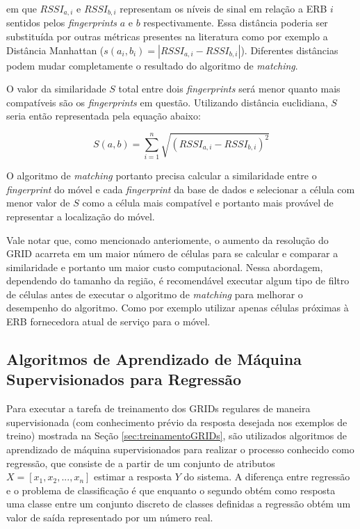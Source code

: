 \documentclass[12pt]{article}
\begin{document}
                \noindent em que $RSSI_{a,i}$ e $RSSI_{b,i}$ representam os níveis de sinal em relação a ERB $i$ sentidos pelos \textit{fingerprints} $a$ e $b$ respectivamente. Essa distância poderia ser substituída por outras métricas presentes na literatura como por exemplo a Distância Manhattan ($s(a_{i}, b_{i}) = |RSSI_{a,i} - RSSI_{b,i}|$). Diferentes distâncias podem mudar completamente o resultado do algoritmo de \textit{matching}. 
                
                O valor da similaridade $S$ total entre dois \textit{fingerprints} será menor quanto mais compatíveis são os \textit{fingerprints} em questão. Utilizando distância euclidiana, $S$ seria então representada pela equação abaixo:
                
                \begin{equation} 
                \label{eq:similaridadeEuclidiana}
                S(a,b) = \sum_{i=1}^{n} \sqrt{(RSSI_{a,i} - RSSI_{b,i})^2} 
                \end{equation}
                
                O algoritmo de \textit{matching} portanto precisa calcular a similaridade entre o \textit{fingerprint} do móvel e cada \textit{fingerprint} da base de dados e selecionar a célula com menor valor de $S$ como a célula mais compatível e portanto mais provável de representar a localização do móvel.
                
                Vale notar que, como mencionado anteriomente, o aumento da resolução do GRID acarreta em um maior número de células para se calcular e comparar a similaridade e portanto um maior custo computacional. Nessa abordagem, dependendo do tamanho da região, é recomendável executar algum tipo de filtro de células antes de executar o algoritmo de \textit{matching} para melhorar o desempenho do algoritmo. Como por exemplo utilizar apenas células próximas à ERB fornecedora atual de serviço para o móvel.  

        \subsection{Algoritmos de Aprendizado de Máquina Supervisionados para Regressão}
        \label{sec:aprendizadoDeMaquina}
        
        Para executar a tarefa de treinamento dos GRIDs regulares de maneira supervisionada (com conhecimento prévio da resposta desejada nos exemplos de treino) mostrada na Seção \ref{sec:treinamentoGRIDs}, são utilizados algoritmos de aprendizado de máquina supervisionados para realizar o processo conhecido como regressão, que consiste de a partir de um conjunto de atributos $X = [x_1, x_2, ..., x_n]$ estimar a resposta $Y$ do sistema. A diferença entre regressão e o problema de classificação é que enquanto o segundo obtém como resposta uma classe entre um conjunto discreto de classes definidas a regressão obtém um valor de saída representado por um número real. 
        
\end{document}
